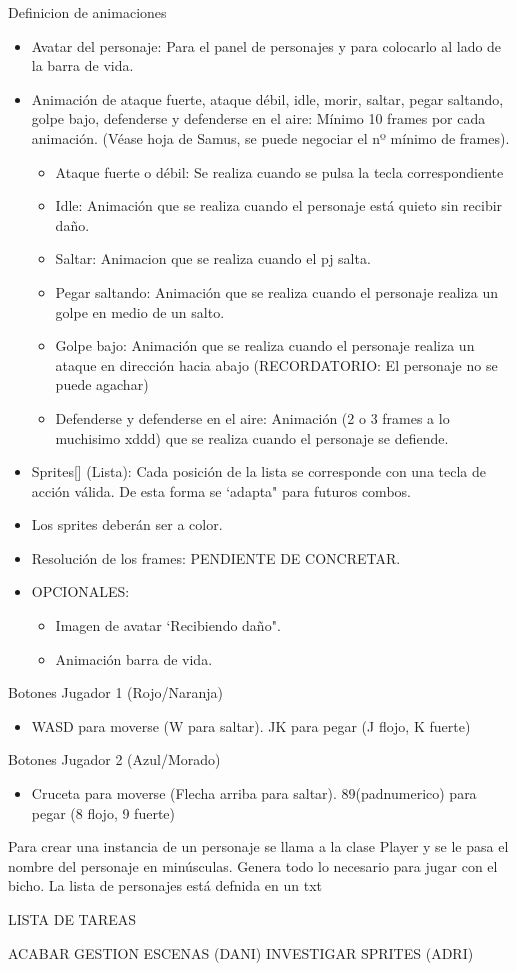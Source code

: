 \documentclass[10pt,a4paper,titlepage]{article}
\begin{document}
Definicion de animaciones 
\begin{itemize}
	\item Avatar del personaje: Para el panel de personajes y para colocarlo al lado de la barra de vida.
	\item Animación de ataque fuerte, ataque débil, idle, morir, saltar, pegar saltando, golpe bajo, defenderse y defenderse en el aire: Mínimo 10 frames por cada animación. (Véase hoja de Samus, se puede negociar el nº mínimo de frames).
	\begin{itemize}
		\item Ataque fuerte o débil: Se realiza cuando se pulsa la tecla correspondiente
		\item Idle: Animación que se realiza cuando el personaje está quieto sin recibir daño.
		\item Saltar: Animacion que se realiza cuando el pj salta.
		\item Pegar saltando: Animación que se realiza cuando el personaje realiza un golpe en medio de un salto.
		\item Golpe bajo: Animación que se realiza cuando el personaje realiza un ataque en dirección hacia abajo (RECORDATORIO: El personaje no se puede agachar)
		\item Defenderse y defenderse en el aire: Animación (2 o 3 frames a lo muchisimo xddd) que se realiza cuando el personaje se defiende.
	\end{itemize}
	\item Sprites[] (Lista): Cada posición de la lista se corresponde con una tecla de acción válida. De esta forma se `adapta" para futuros combos.
	\item Los sprites deberán ser a color.
	\item Resolución de los frames: PENDIENTE DE CONCRETAR.
	\item OPCIONALES: 
	\begin{itemize}
		\item Imagen de avatar `Recibiendo daño".
		\item Animación barra de vida.
	\end{itemize}
\end{itemize}


Botones Jugador 1 (Rojo/Naranja)
\begin{itemize}
	\item WASD para moverse (W para saltar). JK para pegar (J flojo, K fuerte)
\end{itemize}
Botones Jugador 2 (Azul/Morado)
\begin{itemize}
	\item Cruceta para moverse (Flecha arriba para saltar). 89(padnumerico) para pegar (8 flojo, 9 fuerte)
\end{itemize}

Para crear una instancia de un personaje se llama a la clase Player y se le pasa el nombre del personaje en minúsculas. Genera todo lo necesario para jugar con el bicho.
La lista de personajes está defnida en un txt


LISTA DE TAREAS

ACABAR GESTION ESCENAS (DANI)
INVESTIGAR SPRITES (ADRI)
\end{document}
